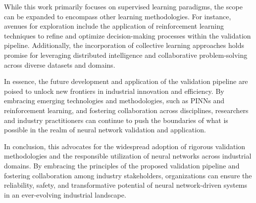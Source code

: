 While this work primarily focuses on supervised learning paradigms, the scope can be expanded to encompass other learning methodologies. For instance, avenues for exploration include the application of reinforcement learning\cite{kaelbling1996reinforcement} techniques to refine and optimize decision-making processes within the validation pipeline. Additionally, the incorporation of collective learning approaches holds promise for leveraging distributed intelligence and collaborative problem-solving across diverse datasets and domains.

In essence, the future development and application of the validation pipeline are poised to unlock new frontiers in industrial innovation and efficiency. By embracing emerging technologies and methodologies, such as PINNs and reinforcement learning, and fostering collaboration across disciplines, researchers and industry practitioners can continue to push the boundaries of what is possible in the realm of neural network validation and application.


In conclusion, this  advocates for the widespread adoption of rigorous validation methodologies and the responsible utilization of neural networks across industrial domains. By embracing the principles of the proposed validation pipeline and fostering collaboration among industry stakeholders, organizations can ensure the reliability, safety, and transformative potential of neural network-driven systems in an ever-evolving industrial landscape.